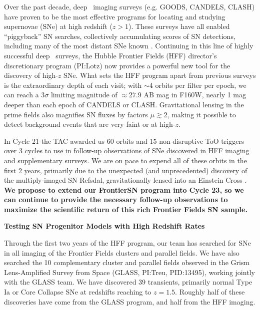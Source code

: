 \documentclass[12pt]{article}
\begin{document}
%
%
\justification          %

Over the past decade, deep \HST\ imaging surveys (e.g. GOODS, CANDELS,
CLASH) have proven to be the most effective programs for locating and
studying supernovae (SNe) at high redshift ($z>1$).  These surveys
have all enabled ``piggyback'' SN searches, collectively
accumulating scores of SN detections, including many of the most
distant SNe known
\citep{Riess:2007,Dahlen:2008,Graur:2014,Rodney:2014}.  Continuing in
this line of highly successful deep \HST\ surveys, the Hubble Frontier
Fields (HFF) director's discretionary program (PI:Lotz) now provides a
powerful new tool for the discovery of high-$z$ SNe.  What sets the
HFF program apart from previous surveys is the extraordinary depth of
each visit; with $\sim$4 orbits per filter per epoch, we can reach a
$3\sigma$ limiting magnitude of $\approx27.9$ AB mag in F160W, nearly
1 mag deeper than each epoch of CANDELS or CLASH. Gravitational
lensing in the prime fields also magnifies SN fluxes by factors
$\mu\gtrsim2$, making it possible to detect background events that are
very faint or at high-$z$.

In Cycle 21 the TAC awarded us 60 orbits and 15 non-disruptive ToO
triggers over 3 cycles to use in follow-up observations of SNe
discovered in HFF imaging and supplementary surveys. We are on pace to
expend all of these orbits in the first 2 years, primarily due to the
unexpected (and unprecedented) discovery of the multiply-imaged SN
Refsdal, gravitationally lensed into an Einstein Cross
\citep{Kelly:2015}.  {\bf We propose to extend our FrontierSN program
  into Cycle 23, so we can continue to provide the necessary follow-up
  observations to maximize the scientific return of this rich Frontier
  Fields SN sample.}

\bigskip
\centerline {\bf Testing SN Progenitor Models with High Redshift Rates} 
\medskip

Through the first two years of the HFF program, our team has searched
for SNe in all imaging of the Frontier Fields clusters and parallel
fields.  We have also searched the 10 complementary cluster and
parallel fields observed in the Grism Lens-Amplified Survey from Space
(GLASS, PI:Treu, PID:13495), working jointly with the GLASS team.  We
have discovered 39 transients, primarily normal Type Ia or Core
Collapse SNe at redshifts reaching to $z=1.5$.  Roughly half of these
discoveries have come from the GLASS program, and half from the HFF
imaging.
\end{document}
